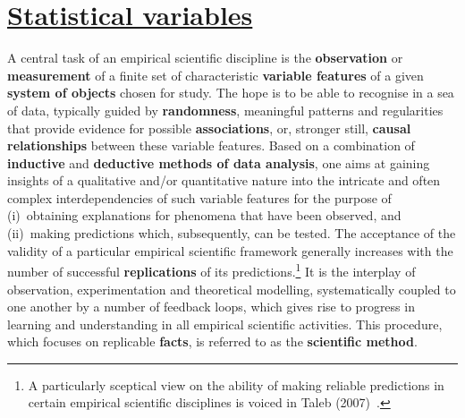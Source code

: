 \chapter[Statistical variables]{\href{https://www.youtube.com/watch?v=DXkHcaiRcd4}{Statistical variables}}
A central task of an empirical scientific discipline is the
\textbf{observation} or \textbf{measurement} of a  finite set of
characteristic \textbf{variable features} of a given
\textbf{system of objects} chosen for study. The hope is to be able
to recognise in a sea of data, typically guided by
\textbf{randomness}, meaningful patterns and regularities that
provide evidence for possible \textbf{associations}, or, stronger
still, \textbf{causal relationships} between these variable
features. Based on a combination of \textbf{inductive} and
\textbf{deductive methods of data analysis}, one aims at gaining
insights of a qualitative and/or quantitative nature into the
intricate and often complex interdependencies of such variable
features for the purpose of (i)~obtaining explanations for
phenomena that have been observed, and (ii)~making predictions
which, subsequently, can be tested. 
The acceptance of the validity of a particular empirical 
scientific framework generally increases with the number of 
successful \textbf{replications} of its predictions.\footnote{A 
particularly sceptical view on the ability of making reliable
predictions in certain empirical scientific disciplines is voiced 
in Taleb (2007)~.} It is the interplay of 
observation, experimentation and theoretical modelling, 
systematically coupled to one another by a number of 
feedback loops, which gives rise to progress in learning and 
understanding in all empirical scientific activities. This 
procedure, which focuses on replicable \textbf{facts}, is
referred to as the \textbf{scientific method}.


